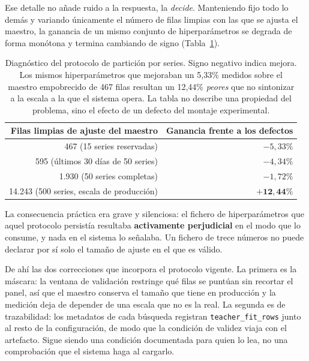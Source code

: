 Ese detalle no añade ruido a la respuesta, la \emph{decide}. Manteniendo fijo todo lo demás y
variando únicamente el número de filas limpias con las que se ajusta el maestro, la ganancia de
un mismo conjunto de hiperparámetros se degrada de forma monótona y termina cambiando de signo
(Tabla~\ref{tab:tuning_reversion}).

\begin{table}[htbp]
    \centering
    \small
    \begin{tabular}{rr}
        \toprule
        \textbf{Filas limpias de ajuste del maestro} & \textbf{Ganancia frente a los defectos} \\
        \midrule
        467 (15 series reservadas) & $-5{,}33\%$ \\
        595 (últimos 30 días de 50 series) & $-4{,}34\%$ \\
        1.930 (50 series completas) & $-1{,}72\%$ \\
        14.243 (500 series, escala de producción) & $\mathbf{+12{,}44\%}$ \\
        \bottomrule
    \end{tabular}
    \caption[Diagnóstico de la partición por series]{Diagnóstico del protocolo de partición por series. Signo negativo indica mejora. Los
    mismos hiperparámetros que mejoraban un 5{,}33\% medidos sobre el maestro empobrecido de 467
    filas resultan un 12{,}44\% \emph{peores} que no sintonizar a la escala a la que el sistema
    opera. La tabla no describe una propiedad del problema, sino el efecto de un defecto del
    montaje experimental.}
    \label{tab:tuning_reversion}
\end{table}

La consecuencia práctica era grave y silenciosa: el fichero de hiperparámetros que aquel
protocolo persistía resultaba \textbf{activamente perjudicial} en el modo que lo consume, y nada
en el sistema lo señalaba. Un fichero de trece números no puede declarar por sí solo el tamaño de
ajuste en el que es válido.

De ahí las dos correcciones que incorpora el protocolo vigente. La primera es la máscara: la
ventana de validación restringe qué filas se puntúan sin recortar el panel, así que el maestro
conserva el tamaño que tiene en producción y la medición deja de depender de una escala que no
es la real. La segunda es de trazabilidad: los metadatos de cada búsqueda registran
\texttt{teacher\_fit\_rows} junto al resto de la configuración, de modo que la condición de
validez viaja con el artefacto. Sigue siendo una condición documentada para quien lo lea, no una
comprobación que el sistema haga al cargarlo.

